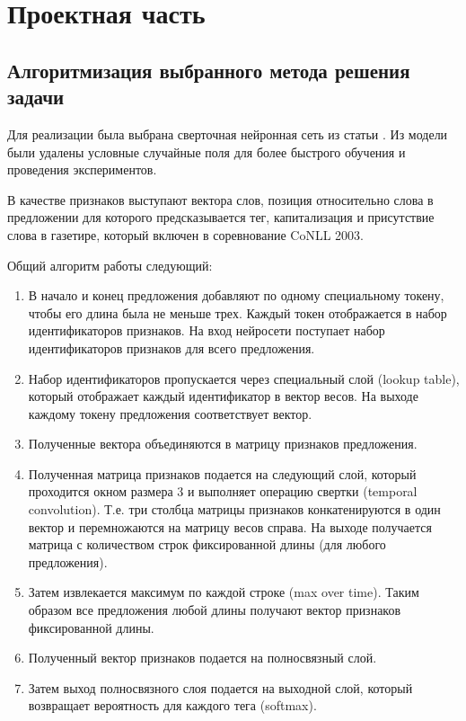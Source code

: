 \chapter{Проектная часть}
\section{Алгоритмизация выбранного метода решения задачи }

  Для реализации была выбрана сверточная нейронная сеть из статьи \citep{collobert2011natural}.
  Из модели были удалены условные случайные поля для более быстрого обучения и проведения экспериментов.

  В качестве признаков выступают вектора слов, позиция относительно слова в предложении
  для которого предсказывается тег, капитализация и присутствие слова в газетире,
  который включен в соревнование CoNLL 2003.

  Общий алгоритм работы следующий:
  \begin{enumerate}
    \item В начало и конец предложения добавляют по одному специальному токену, чтобы его длина была
    не меньше трех. Каждый токен отображается в набор идентификаторов признаков.
    На вход нейросети поступает набор идентификаторов признаков для всего предложения.

    \item Набор идентификаторов пропускается через специальный слой (lookup table), который отображает
    каждый идентификатор в вектор весов. На выходе каждому токену предложения соответствует
    вектор.
    \item Полученные вектора объединяются в матрицу признаков предложения.
    \item Полученная матрица признаков подается на следующий
    слой, который проходится окном размера 3 и выполняет операцию свертки (temporal convolution).
    Т.е. три столбца матрицы признаков конкатенируются в один вектор и перемножаются
    на матрицу весов справа.
    На выходе получается матрица с количеством строк фиксированной длины (для любого предложения).
    \item Затем извлекается максимум по каждой строке (max over time).
    Таким образом все предложения любой длины получают вектор признаков фиксированной длины.
    \item Полученный вектор признаков подается на полносвязный слой.
    \item Затем выход полносвязного слоя подается на выходной слой, который возвращает вероятность
    для каждого тега (softmax).
  \end{enumerate}

